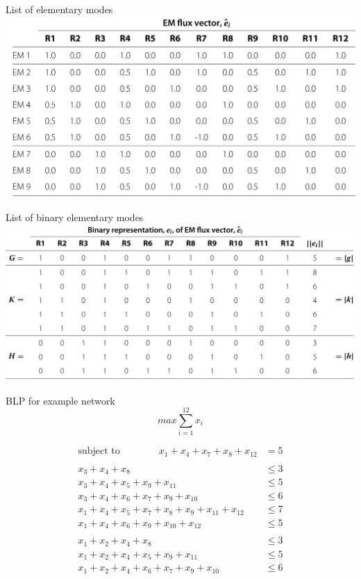 \documentclass{beamer}
\begin{document}
\begin{frame}{List of elementary modes}
    \includegraphics[width=\textwidth]{grafik/table1a} \\
\end{frame}

\begin{frame}{List of binary elementary modes}
    \includegraphics[width=\textwidth]{grafik/table1b} \\
\end{frame}

\begin{frame}{BLP for example network}
    $$max \sum_{i=1}^{12} x_i$$
     
    \begin{align*}
\text{subject to}\quad\quad\quad\quad
    x_1 + x_4 + x_7 + x_8 + x_{12}                      & = 5   \\
    \\
    x_3 + x_4 + x_8                                     & \leq 3 \\
    x_3 + x_4 + x_5 + x_9 + x_{11}                      & \leq 5 \\
    x_3 + x_4 + x_6 + x_7 + x_9 + x_{10}                & \leq 6 \\
    x_1 + x_4 + x_5 + x_7 + x_8 + x_9 + x_{11} + x_{12} & \leq 7 \\
    x_1 + x_4 + x_6 + x_9 + x_{10} + x_{12}             & \leq 5 \\
    \\
    x_1 + x_2 + x_4 + x_8                               & \leq 3 \\
    x_1 + x_2 + x_4 + x_5 + x_9 + x_{11}                & \leq 5 \\
    x_1 + x_2 + x_4 + x_6 + x_7 + x_9 + x_{10}          & \leq 6 \\
    \end{align*}
\end{frame}
\end{document}
